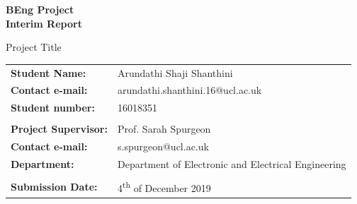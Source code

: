 \documentclass[a4paper,12pt]{report}
\author{Arundathi Shaji Shanthini}
\begin{document}
\begin{titlepage}
    \setlength{\voffset}{-1.8in}
    \noindent \noindent {}
    
    \vspace{40mm}

    \begin{center}
        {\LARGE \textbf{BEng Project}}\\
        \vspace{4mm}
        {\Huge \textbf{Interim Report}}
    \end{center}
    
    \vspace{10mm}
    
    \begin{center}
    \begin{spacing}{1.8}
    {\LARGE
    Project Title}
    \end{spacing}
    \end{center}
    
    \vspace{18mm}
    
     \begin{tabular}{ll}
        \textbf{Student Name:}  & \hspace{4mm} Arundathi Shaji Shanthini \\
       \textbf{Contact e-mail:} & \hspace{4mm} arundathi.shanthini.16@ucl.ac.uk \\
        \textbf{Student number:} & \hspace{4mm} 16018351 \\ \\ 
        \textbf{Project Supervisor:}  & \hspace{4mm} Prof. Sarah Spurgeon \\
        \textbf{Contact e-mail:}  & \hspace{4mm} s.spurgeon@ucl.ac.uk \\
         \textbf{Department:} & \hspace{4mm} Department of Electronic and Electrical Engineering\\ \\ 
          \textbf{Submission Date:} & \hspace{4mm} 4\textsuperscript{th} of December 2019
    \end{tabular}
\end{titlepage}
\end{document}

